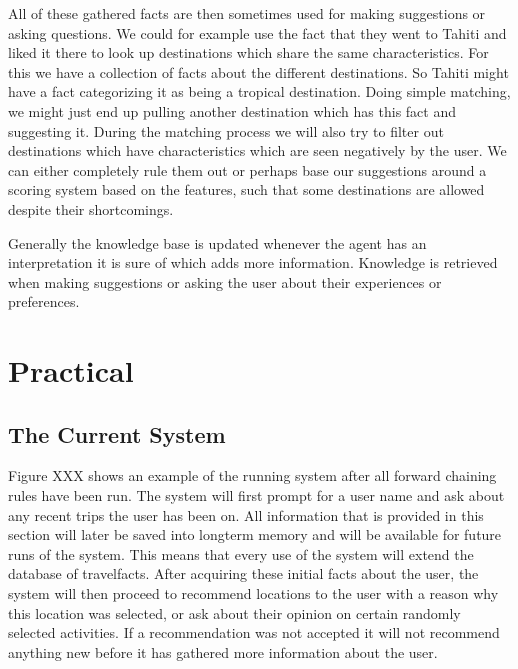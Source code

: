 \documentclass[11pt]{article} %
\begin{document}
All of these gathered facts are then sometimes used for making suggestions or asking questions. We could for example use the fact that they went to Tahiti and liked it there to look up destinations which share the same characteristics. For this we have a collection of facts about the different destinations. So Tahiti might have a fact categorizing it as being a tropical destination. Doing simple matching, we might just end up pulling another destination which has this fact and suggesting it. During the matching process we will also try to filter out destinations which have characteristics which are seen negatively by the user. We can either completely rule them out or perhaps base our suggestions around a scoring system based on the features, such that some destinations are allowed despite their shortcomings.


Generally the knowledge base is updated whenever the agent has an interpretation it is sure of which adds more information. Knowledge is retrieved when making suggestions or asking the user about their experiences or preferences.


\section{Practical}

\subsection{The Current System}
Figure XXX shows an example of the running system after all forward chaining rules have been run. The system will first prompt for a user name and ask about any recent trips the user has been on. All information that is provided in this section will later be saved into longterm memory and will be available for future runs of the system. This means that every use of the system will extend the database of travelfacts.
After acquiring these initial facts about the user, the system will then proceed to recommend locations to the user with a reason why this location was selected, or ask about their opinion on certain randomly selected activities. If a recommendation was not accepted it will not recommend anything new before it has gathered more information about the user.
\end{document}
